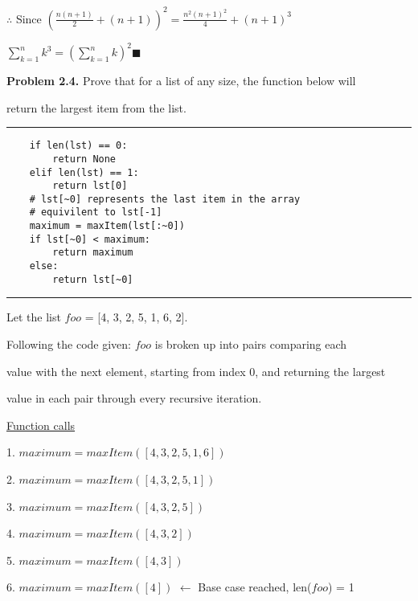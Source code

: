 \documentclass{article}
\begin{document}
\vspace{0.3cm}

$\therefore $ Since $ \left(\frac{n(n+1)}{2} + (n+1) \right)^2 = \frac{n^2(n+1)^2}{4} + (n+1)^3 $ 

$\displaystyle\sum_{k=1}^{n} k^3 = \left( \displaystyle\sum_{k=1}^{n} k \right)^2 \blacksquare $

\vspace{3.2cm}

\textbf{Problem 2.4.} Prove that for a list of any size, the function below will 

return the largest item from the list.

\vspace{0.5cm}

\hrule

\begin{verbatim}
    if len(lst) == 0:
        return None
    elif len(lst) == 1:
        return lst[0]
    # lst[~0] represents the last item in the array
    # equivilent to lst[-1]
    maximum = maxItem(lst[:~0])
    if lst[~0] < maximum:
        return maximum
    else:
        return lst[~0]
\end{verbatim}

\hrule

\vspace{0.5cm}

Let the list $foo$ = [4, 3, 2, 5, 1, 6, 2].

\vspace{0.5cm}

Following the code given: $foo$ is broken up into pairs comparing each 

value with the next element, starting from index 0, and returning the largest 

value in each pair through every recursive iteration.

\vspace{0.5cm}

\underline{Function calls}

1. $maximum = maxItem([4,3,2,5,1,6])$

2. $maximum = maxItem([4,3,2,5,1])$

3. $maximum = maxItem([4,3,2,5])$

4. $maximum = maxItem([4,3,2])$

5. $maximum = maxItem([4,3])$

6. $maximum = maxItem([4])$ $\leftarrow$ Base case reached, len($foo$) = 1

\vspace{0.5cm}
\end{document}
